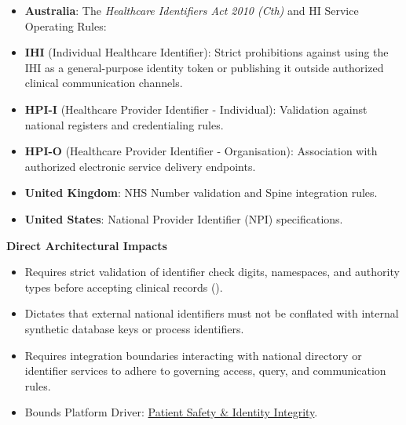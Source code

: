 \begin{itemize}


\item \textbf{Australia}: The \emph{Healthcare Identifiers Act 2010 (Cth)} and HI Service Operating Rules:

\item \textbf{IHI} (Individual Healthcare Identifier): Strict prohibitions against using the IHI as a general-purpose identity token or publishing it outside authorized clinical communication channels.

\item \textbf{HPI-I} (Healthcare Provider Identifier - Individual): Validation against national registers and credentialing rules.

\item \textbf{HPI-O} (Healthcare Provider Identifier - Organisation): Association with authorized electronic service delivery endpoints.

\item \textbf{United Kingdom}: NHS Number validation and Spine integration rules.

\item \textbf{United States}: National Provider Identifier (NPI) specifications.

\end{itemize}


\par\medskip\textbf{Direct Architectural Impacts}\par


\begin{itemize}


\item Requires strict validation of identifier check digits, namespaces, and authority types before accepting clinical records (\href{\detokenize{../../../../../docs/markdown/01-motivation/requirements-constraints/foundational-requirements.md}}{\texttt{}}).

\item Dictates that external national identifiers must not be conflated with internal synthetic database keys or process identifiers.

\item Requires integration boundaries interacting with national directory or identifier services to adhere to governing access, query, and communication rules.

\item Bounds Platform Driver: \href{\detokenize{../../../../../docs/markdown/01-motivation/drivers-assessments/drivers.md}}{Patient Safety \& Identity Integrity}.

\end{itemize}

